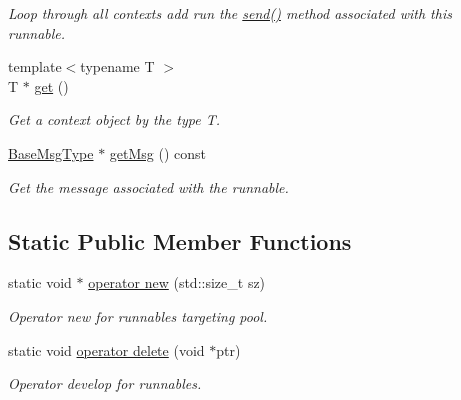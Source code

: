 \begin{DoxyCompactItemize}
\begin{DoxyCompactList}\small\item\em Loop through all contexts add run the {\ttfamily \hyperlink{structvt_1_1runnable_1_1_runnable_new_aa7e06ec59e7376d1d01dfa6ab9a9563b}{send()}} method associated with this runnable. \end{DoxyCompactList}\item 
{\footnotesize template$<$typename T $>$ }\\T $\ast$ \hyperlink{structvt_1_1runnable_1_1_runnable_new_a140176f3b035d504ad1e726e3c7b09fa}{get} ()
\begin{DoxyCompactList}\small\item\em Get a context object by the type {\ttfamily T}. \end{DoxyCompactList}\item 
\hyperlink{namespacevt_a44d0d4e144748f2b19a1cfd962f50338}{Base\+Msg\+Type} $\ast$ \hyperlink{structvt_1_1runnable_1_1_runnable_new_aed655dff826a821a3db9162259f33288}{get\+Msg} () const
\begin{DoxyCompactList}\small\item\em Get the message associated with the runnable. \end{DoxyCompactList}\end{DoxyCompactItemize}
\subsection*{Static Public Member Functions}
\begin{DoxyCompactItemize}
\item 
static void $\ast$ \hyperlink{structvt_1_1runnable_1_1_runnable_new_a5d8c6436fb1652aa48d9b46798a068e5}{operator new} (std\+::size\+\_\+t sz)
\begin{DoxyCompactList}\small\item\em Operator new for runnables targeting pool. \end{DoxyCompactList}\item 
static void \hyperlink{structvt_1_1runnable_1_1_runnable_new_a1e5a02fffcec8b10eb11666a1e0f4120}{operator delete} (void $\ast$ptr)
\begin{DoxyCompactList}\small\item\em Operator develop for runnables. \end{DoxyCompactList}\end{DoxyCompactItemize}

